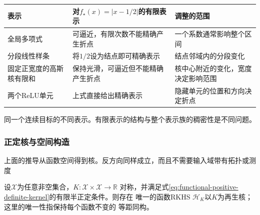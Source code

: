 \begin{fullwidth}
\begin{minipage}{\linewidth}
 \centering\small
 \begin{tabularx}{\linewidth}{@{}lXX@{}}
 \toprule
 表示 & 对$f_\star(x)=|x-1/2|$的有限表示 & 调整的范围\\
 \midrule
 全局多项式 & 可逼近，有限次数不能精确产生折点 & 一个系数通常影响整个区间\\
 分段线性样条 & 将$1/2$设为结点即可精确表示 & 结点邻域内的分段变化\\
 固定正宽度的高斯核有限和 & 保持光滑，可逼近但不能精确产生折点 & 核中心附近的变化，宽度决定影响范围\\
 两个ReLU单元 & 上式直接给出精确表示 & 隐藏单元的位置和方向决定折点\\
 \bottomrule
 \end{tabularx}
   {同一个连续目标的不同表示。有限表示的结构与整个表示族的稠密性是不同问题。}
\end{minipage}
\end{fullwidth}

\subsubsection{正定核与空间构造}

上面的推导从函数空间得到核。反方向同样成立，而且不需要输入域带有拓扑或测度

\begin{theorem}[正定核的RKHS构造]
\label{thm:functional-moore-aronszajn-construction}
设$\mathcal{X}$为任意非空集合，$K:\mathcal{X}\times\mathcal{X}\to\mathbb{R}$
对称，并满足式\eqref{eq:functional-positive-definite-kernel}的有限半正定条件。则存在
唯一的函数RKHS $\mathcal{H}_K$以$K$为再生核；这里的唯一性指保持每个函数不变的
等距同构。
\end{theorem}

